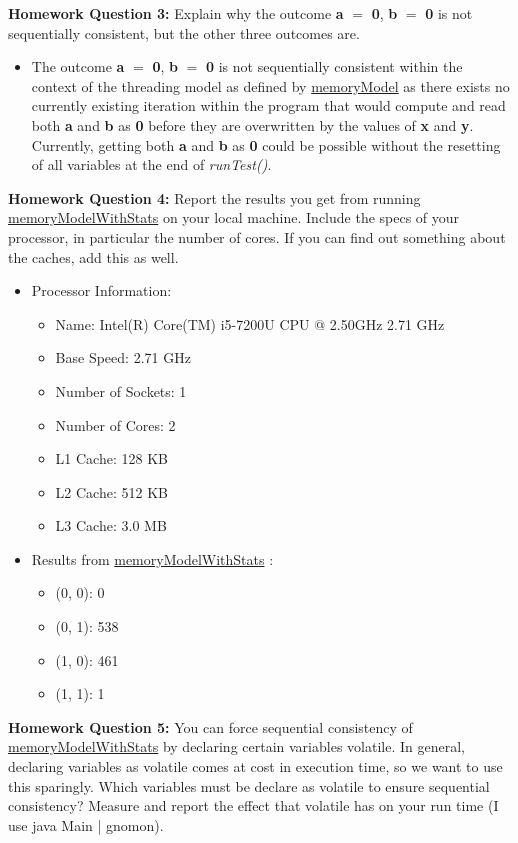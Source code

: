 \documentclass{article}
\theoremstyle{theorem}
\theoremstyle{definition}
\theoremstyle{remark}
\begin{document}
\textbf{Homework Question 3:} Explain why the outcome \textbf{a} $=$ \textbf{0}, \textbf{b} $=$ \textbf{0} is not sequentially consistent, but the other three outcomes are.
\begin{itemize}
    \item The outcome \textbf{a} $=$ \textbf{0}, \textbf{b} $=$ \textbf{0} is not sequentially consistent within the context of the threading model as defined by \href{https://www.online-java.com/yFkZ4HqfRG}{memoryModel} as there exists no currently existing iteration within the program that would compute and read both \textbf{a} and \textbf{b} as \textbf{0} before they are overwritten by the values of \textbf{x} and \textbf{y}. Currently, getting both \textbf{a} and \textbf{b} as \textbf{0} could be possible without the resetting of all variables at the end of \textit{runTest()}.
\end{itemize}
\textbf{Homework Question 4:} Report the results you get from running \href{https://www.online-java.com/yFkZ4HqfRG}{memoryModelWithStats} on your local machine. Include the specs of your processor, in particular the number of cores. If you can find out something about the caches, add this as well.
\begin{itemize}
    \item Processor Information:
    \begin{itemize}
        \item Name: Intel(R) Core(TM) i5-7200U CPU @ 2.50GHz   2.71 GHz
        \item Base Speed: 2.71 GHz
        \item Number of Sockets: 1
        \item Number of Cores: 2
        \item L1 Cache: 128 KB
        \item L2 Cache: 512 KB
        \item L3 Cache: 3.0 MB
    \end{itemize}
    \item Results from \href{https://www.online-java.com/yFkZ4HqfRG}{memoryModelWithStats} :
    \begin{itemize}
        \item (0, 0): 0
        \item (0, 1): 538
        \item (1, 0): 461
        \item (1, 1): 1
    \end{itemize}
\end{itemize}
\textbf{Homework Question 5:} You can force sequential consistency of \href{https://www.online-java.com/yFkZ4HqfRG}{memoryModelWithStats} by declaring certain variables volatile. In general, declaring variables as volatile comes at cost in execution time, so we want to use this sparingly. Which variables must be declare as volatile to ensure sequential consistency? Measure and report the effect that volatile has on your run time (I use java Main | gnomon).
\end{document}
